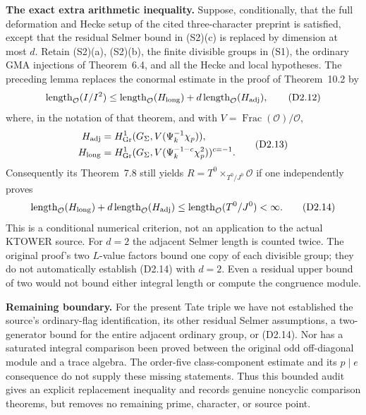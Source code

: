 \documentclass[11pt,a4paper]{article}
\theoremstyle{definition}
\renewcommand{\paragraph}[1]{\par\smallskip\noindent\textbf{#1}\quad\ignorespaces}
\begin{document}
\paragraph{The exact extra arithmetic inequality.}
Suppose, conditionally, that the full deformation and Hecke
setup of the cited three-character preprint is satisfied,
except that the residual Selmer bound in (S2)(c) is replaced
by dimension at most $d$.  Retain (S2)(a), (S2)(b), the
finite divisible groups in (S1), the ordinary GMA injections
of Theorem~6.4, and all the Hecke and local hypotheses.
The preceding lemma replaces the conormal estimate in the
proof of Theorem~10.2 by
\[
 \operatorname{length}_{\mathcal O}(I/I^2)
 \leq\operatorname{length}_{\mathcal O}(H_{\rm long})
       +d\operatorname{length}_{\mathcal O}(H_{\rm adj}),       \tag{D2.12}
\]
where, in the notation of that theorem, and with
$V=\operatorname{Frac}(\mathcal O)/\mathcal O$,
\[
 \begin{aligned}
 H_{\rm adj}&=H^1_{\rm Gr}
   (G_\Sigma,V(\Psi_k^{-1}\chi_p)),\\
 H_{\rm long}&=H^1_{\rm Gr}
   (G_\Sigma,V(\Psi_k^{-1-c}\chi_p^2))^{c=-1}.
 \end{aligned}                                                \tag{D2.13}
\]
Consequently its Theorem~7.8 still yields $R=T^0\times_{T^0/J^0}
\mathcal O$ if one independently proves
\[
 \operatorname{length}_{\mathcal O}(H_{\rm long})
       +d\operatorname{length}_{\mathcal O}(H_{\rm adj})
 \leq\operatorname{length}_{\mathcal O}(T^0/J^0)<\infty.       \tag{D2.14}
\]
This is a conditional numerical criterion, not an application
to the actual KTOWER source.  For $d=2$ the adjacent Selmer
length is counted twice.  The original proof's two $L$-value
factors bound one copy of each divisible group; they do not
automatically establish (D2.14) with $d=2$.
Even a residual upper bound of two would not bound either
integral length or compute the congruence module.

\paragraph{Remaining boundary.}
For the present Tate triple we have not established the
source's ordinary-flag identification, its other residual
Selmer assumptions, a two-generator bound for the entire
adjacent ordinary group, or (D2.14).  Nor has a saturated
integral comparison been proved between the original odd
off-diagonal module and a trace algebra.  The order-five
class-component estimate and its $p\mid e$ consequence do
not supply these missing statements.  Thus this bounded
audit gives an explicit replacement inequality and records
genuine noncyclic comparison theorems, but removes no
remaining prime, character, or source point.
\end{document}
